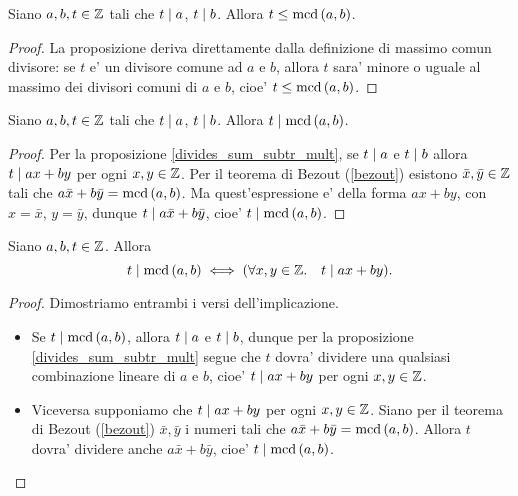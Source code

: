 \begin{proposition} \label{greatest_common_divisor}
    Siano $a, b, t \in \mathbb{Z}$ tali che $t \mid a$, $t \mid b$. Allora $t \leq \operatorname{mcd}\left(a, b\right)$.
\end{proposition}
\begin{proof}
    La proposizione deriva direttamente dalla definizione di massimo comun divisore: se $t$ e' un divisore comune ad $a$ e $b$, allora $t$ sara' minore o uguale al massimo dei divisori comuni di $a$ e $b$, cioe' $t \leq \operatorname{mcd}\left(a, b\right)$.
\end{proof}

\begin{proposition} \label{divisori_dividono_mcd}
    Siano $a, b, t \in \mathbb{Z}$ tali che $t \mid a$, $t \mid b$.  Allora $t \mid \operatorname{mcd}\left(a, b\right)$.
\end{proposition}
\begin{proof}
    Per la proposizione \ref{divides_sum_subtr_mult}, se $t \mid a$ e $t \mid b$ allora $t \mid ax+by$ per ogni $x, y \in \mathbb{Z}$.
    Per il teorema di Bezout (\ref{bezout}) esistono $\bar{x}, \bar{y} \in \mathbb{Z}$ tali che $a\bar{x}+b\bar{y} = \operatorname{mcd}\left(a, b\right)$. Ma quest'espressione e' della forma $ax + by$, con $x = \bar{x}$, $y = \bar{y}$, dunque 
    $t \mid a\bar{x} + b\bar{y}$, cioe' $t \mid \operatorname{mcd}\left(a, b\right)$.
\end{proof}

\begin{proposition} \label{t_divides_gcd_lincomb}
    Siano $a, b, t \in \mathbb{Z}$. Allora 
    \begin{equation}
        t \mid \operatorname{mcd}\left(a, b\right) \iff (\forall x, y \in \mathbb{Z}. \quad t \mid ax + by).
    \end{equation}
\end{proposition}
\begin{proof}
    Dimostriamo entrambi i versi dell'implicazione.
    \begin{itemize}
        \item Se $t \mid \operatorname{mcd}\left(a, b\right)$, allora $t \mid a$ e $t \mid b$, dunque per la proposizione \ref{divides_sum_subtr_mult} segue che $t$ dovra' dividere una qualsiasi combinazione lineare di $a$ e $b$, cioe' $t \mid ax+by$ per ogni $x, y \in \mathbb{Z}$.
        \item Viceversa supponiamo che $t \mid ax+by$ per ogni $x, y \in \mathbb{Z}$. Siano per il teorema di Bezout (\ref{bezout}) $\bar{x}, \bar{y}$ i numeri tali che $a\bar{x} + b\bar{y} = \operatorname{mcd}\left(a, b\right)$. Allora $t$ dovra' dividere anche $a\bar{x} + b\bar{y}$, cioe' $t \mid \operatorname{mcd}\left(a, b\right)$.
    \end{itemize}
\end{proof}

